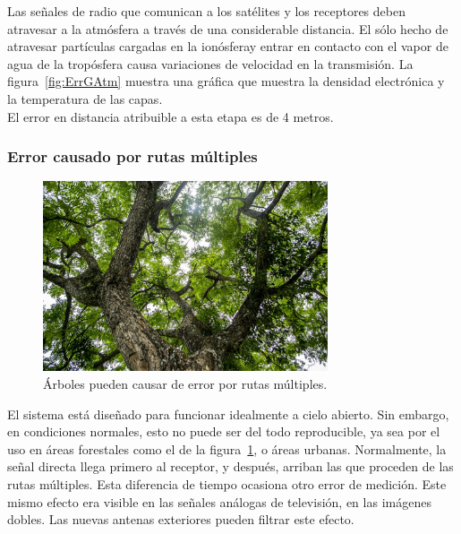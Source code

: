 Las señales de radio que comunican a los satélites y los receptores deben atravesar a la atmósfera a través de una considerable distancia. El sólo hecho de atravesar partículas cargadas en la ionósfera\footnotemark y entrar en contacto con el vapor de agua de la tropósfera causa variaciones de velocidad en la transmisión. La figura~\ref{fig:ErrGAtm} muestra una gráfica que muestra la densidad electrónica y la temperatura de las capas. \\

El error en distancia atribuible a esta etapa es de 4 metros. 


\subsubsection{Error causado por rutas múltiples}

\begin{figure}[H]
\centering
\includegraphics[width=0.75\textwidth]{Figures/RutasMult2}
\caption[Árboles pueden causar error por rutas múltiples.]{Árboles pueden causar de error por rutas múltiples\footnotemark.}
\label{fig:ErrRMul}
\end{figure}


 El sistema está diseñado para funcionar idealmente a cielo abierto. Sin embargo, en condiciones normales, esto no puede ser del todo reproducible, ya sea por el uso en áreas forestales como el de la figura~\ref{fig:ErrRMul}, o áreas urbanas. Normalmente, la señal directa llega primero al receptor, y después, arriban las que proceden de las rutas múltiples. Esta diferencia de tiempo ocasiona otro error de medición. Este mismo efecto era visible en las señales análogas de televisión, en las imágenes dobles. Las nuevas antenas exteriores pueden filtrar este efecto.


